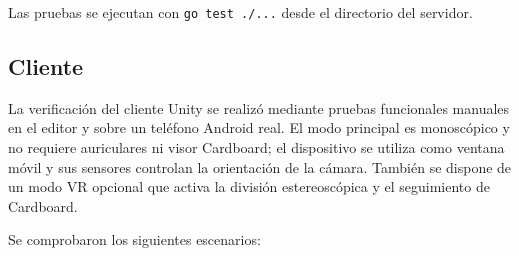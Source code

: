 \documentclass[12pt, a4paper]{article}
\begin{document}
Las pruebas se ejecutan con \texttt{go test ./...} desde el directorio del servidor.

\subsection{Cliente}

La verificación del cliente Unity se realizó mediante pruebas funcionales manuales en
el editor y sobre un teléfono Android real. El modo principal es monoscópico y no
requiere auriculares ni visor Cardboard; el dispositivo se utiliza como ventana móvil
y sus sensores controlan la orientación de la cámara. También se dispone de un modo VR
opcional que activa la división estereoscópica y el seguimiento de Cardboard.

Se comprobaron los siguientes escenarios:
\end{document}
